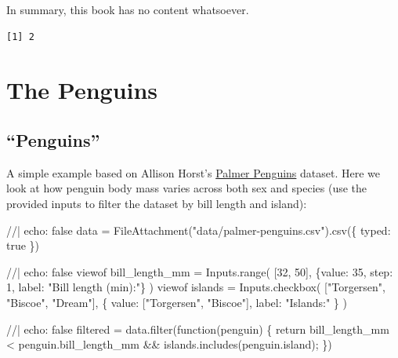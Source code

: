 \documentclass[
  a4paper,
]{scrbook}
\newenvironment{Shaded}{}{}
\newcommand{\NormalTok}[1]{\textcolor[rgb]{0.14,0.16,0.18}{#1}}
\begin{document}
In summary, this book has no content whatsoever.

\begin{verbatim}
[1] 2
\end{verbatim}

\part{The Penguins}

\hypertarget{penguins}{%
\chapter{``Penguins''}\label{penguins}}

A simple example based on Allison Horst's
\href{https://allisonhorst.github.io/palmerpenguins/}{Palmer Penguins}
dataset. Here we look at how penguin body mass varies across both sex
and species (use the provided inputs to filter the dataset by bill
length and island):

\begin{Shaded}
\begin{Highlighting}[numbers=left,,]
\NormalTok{//| echo: false}
\NormalTok{data = FileAttachment("data/palmer{-}penguins.csv").csv(\{ typed: true \})}
\end{Highlighting}
\end{Shaded}

\begin{Shaded}
\begin{Highlighting}[numbers=left,,]
\NormalTok{//| echo: false}
\NormalTok{viewof bill\_length\_mm = Inputs.range(}
\NormalTok{  [32, 50], }
\NormalTok{  \{value: 35, step: 1, label: "Bill length (min):"\}}
\NormalTok{)}
\NormalTok{viewof islands = Inputs.checkbox(}
\NormalTok{  ["Torgersen", "Biscoe", "Dream"], }
\NormalTok{  \{ value: ["Torgersen", "Biscoe"], }
\NormalTok{    label: "Islands:"}
\NormalTok{  \}}
\NormalTok{)}
\end{Highlighting}
\end{Shaded}

\begin{Shaded}
\begin{Highlighting}[numbers=left,,]
\NormalTok{//| echo: false}
\NormalTok{filtered = data.filter(function(penguin) \{}
\NormalTok{  return bill\_length\_mm \textless{} penguin.bill\_length\_mm \&\&}
\NormalTok{         islands.includes(penguin.island);}
\NormalTok{\})}
\end{Highlighting}
\end{Shaded}
\end{document}
